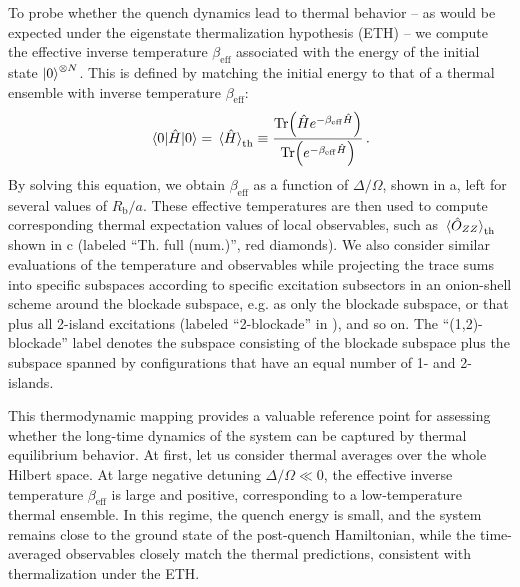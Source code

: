 \documentclass[english,floatfix,twocolumn,showpacs, aps, prx, reprint, superscriptaddress, longbibliography]{revtex4-2}
\begin{document}
To probe whether the quench dynamics lead to thermal behavior -- as would be expected under the eigenstate thermalization hypothesis (ETH) \cite{Deutsch:1991, Srednicki:1994, Rigol:2008, Deutsch:2018}  -- we compute the effective inverse temperature $\beta_\mathrm{eff}$ associated with the energy of the initial state $\ket{0}^{\otimes N}$. This is defined by matching the initial energy to that of a thermal ensemble with inverse temperature $\beta_\mathrm{eff}$: 
\begin{equation}
\mel{0}{\hat{H}}{0} = \expval*{\hat{H}}_\mathrm{th} \equiv \frac{\Tr(\hat{H} e^{-\beta_\mathrm{eff} \hat{H}})}{\Tr(e^{-\beta_\mathrm{eff} \hat{H}})} \, .
\end{equation}
By solving this equation, we obtain $\beta_\mathrm{eff}$ as a function of $\Delta / \Omega$, shown in a, left for several values of $R_\mathrm{b} / a$. These effective temperatures are then used to compute corresponding thermal expectation values of local observables, such as $\expval*{\hat{O}_{ZZ}}_\mathrm{th}$ shown in c (labeled ``Th. full (num.)'', red diamonds). We also consider similar evaluations of the temperature and observables while projecting the trace sums into specific subspaces according to specific excitation subsectors in an onion-shell scheme around the blockade subspace, e.g. as only the blockade subspace, or that plus all 2-island excitations (labeled ``2-blockade'' in ), and so on. The ``(1,2)-blockade'' label denotes the subspace consisting of the blockade subspace plus the subspace spanned by configurations that have an equal number of 1- and 2-islands.

This thermodynamic mapping provides a valuable reference point for assessing whether the long-time dynamics of the system can be captured by thermal equilibrium behavior. At first, let us consider thermal averages over the whole Hilbert space. At large negative detuning $\Delta/\Omega \ll 0$, the effective inverse temperature $\beta_\mathrm{eff}$ is large and positive, corresponding to a low-temperature thermal ensemble. In this regime, the quench energy is small, and the system remains close to the ground state of the post-quench Hamiltonian, while the time-averaged observables closely match the thermal predictions, consistent with thermalization under the ETH.
\end{document}
